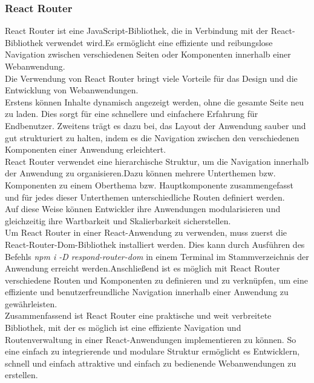 \subsubsection{React Router}
React Router ist eine JavaScript-Bibliothek, die in Verbindung mit der React-Bibliothek verwendet wird.Es ermöglicht   eine effiziente und reibungslose Navigation zwischen verschiedenen Seiten oder Komponenten innerhalb einer Webanwendung.\\ 
Die Verwendung von React Router bringt viele Vorteile für das Design und die  Entwicklung von Webanwendungen.\\
Erstens können Inhalte dynamisch angezeigt werden, ohne  die gesamte Seite neu zu laden. Dies sorgt für eine schnellere und einfachere Erfahrung für  Endbenutzer. Zweitens trägt es dazu bei, das Layout der Anwendung sauber und gut strukturiert zu halten, indem es die Navigation zwischen den verschiedenen Komponenten einer Anwendung erleichtert.\\
React Router verwendet eine hierarchische Struktur, um die Navigation innerhalb der Anwendung zu organisieren.Dazu können  mehrere Unterthemen bzw. Komponenten zu einem Oberthema bzw. Hauptkomponente zusammengefasst und  für jedes dieser Unterthemen unterschiedliche Routen definiert werden.\\
Auf diese Weise können Entwickler ihre Anwendungen modularisieren und gleichzeitig ihre Wartbarkeit und Skalierbarkeit  sicherstellen.\\
Um React Router in einer React-Anwendung zu verwenden, muss  zuerst die React-Router-Dom-Bibliothek installiert werden. Dies kann durch Ausführen des Befehls \emph{npm i -D respond-router-dom} in einem Terminal  im Stammverzeichnis der Anwendung erreicht werden.Anschließend ist es möglich mit React Router verschiedene Routen und Komponenten zu definieren und zu verknüpfen, um eine effiziente und benutzerfreundliche Navigation innerhalb einer Anwendung zu gewährleisten.\\
Zusammenfassend ist React Router eine praktische und weit verbreitete Bibliothek, mit der es möglich ist eine effiziente Navigation und Routenverwaltung in einer React-Anwendungen implementieren zu können. So eine einfach zu integrierende und modulare Struktur ermöglicht es Entwicklern, schnell und einfach attraktive und einfach zu bedienende Webanwendungen zu erstellen.\cite{react-router}

